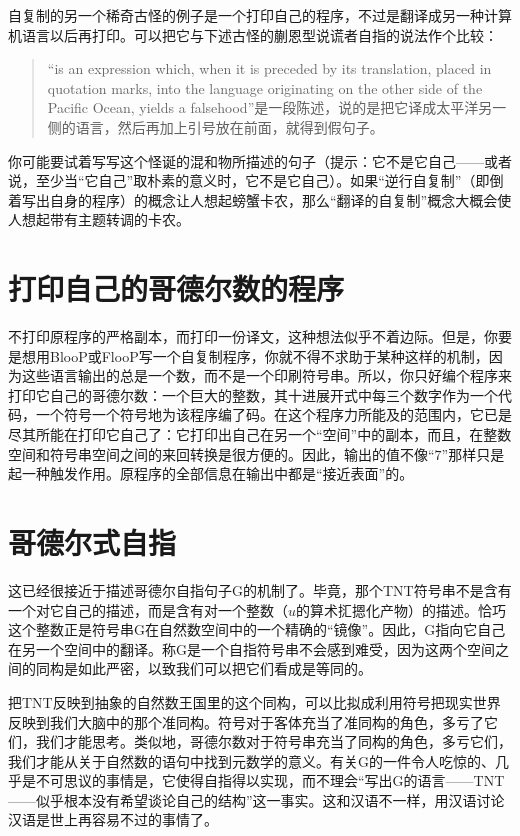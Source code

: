 自复制的另一个稀奇古怪的例子是一个打印自己的程序，不过是翻译成另一种计算机语言以后再打印。可以把它与下述古怪的蒯恩型说谎者自指的说法作个比较：
\begin{quote}
``is an expression which, when it is preceded by its translation, placed in quotation marks, into the language originating on the other side of the Pacific Ocean, yields a falsehood''是一段陈述，说的是把它译成太平洋另一侧的语言，然后再加上引号放在前面，就得到假句子。
\end{quote}

你可能要试着写写这个怪诞的混和物所描述的句子（提示：它不是它自己——或者说，至少当“它自己”取朴素的意义时，它不是它自己）。如果“逆行自复制”（即倒着写出自身的程序）的概念让人想起螃蟹卡农，那么“翻译的自复制”概念大概会使人想起带有主题转调的卡农。

\section{打印自己的哥德尔数的程序}

不打印原程序的严格副本，而打印一份译文，这种想法似乎不着边际。但是，你要是想用BlooP或FlooP写一个自复制程序，你就不得不求助于某种这样的机制，因为这些语言输出的总是一个数，而不是一个印刷符号串。所以，你只好编个程序来打印它自己的哥德尔数：一个巨大的整数，其十进展开式中每三个数字作为一个代码，一个符号一个符号地为该程序编了码。在这个程序力所能及的范围内，它已是尽其所能在打印它自己了：它打印出自己在另一个“空间”中的副本，而且，在整数空间和符号串空间之间的来回转换是很方便的。因此，输出的值不像“$7$”那样只是起一种触发作用。原程序的全部信息在输出中都是“接近表面”的。

\section{哥德尔式自指}

这已经很接近于描述哥德尔自指句子G的机制了。毕竟，那个TNT符号串不是含有一个对它自己的描述，而是含有对一个整数（$u$的算术㧟摁化产物）的描述。恰巧这个整数正是符号串G在自然数空间中的一个精确的“镜像”。因此，G指向它自己在另一个空间中的翻译。称G是一个自指符号串不会感到难受，因为这两个空间之间的同构是如此严密，以致我们可以把它们看成是等同的。

把TNT反映到抽象的自然数王国里的这个同构，可以比拟成利用符号把现实世界反映到我们大脑中的那个准同构。符号对于客体充当了准同构的角色，多亏了它们，我们才能思考。类似地，哥德尔数对于符号串充当了同构的角色，多亏它们，我们才能从关于自然数的语句中找到元数学的意义。有关G的一件令人吃惊的、几乎是不可思议的事情是，它使得自指得以实现，而不理会“写出G的语言——TNT——似乎根本没有希望谈论自己的结构”这一事实。这和汉语不一样，用汉语讨论汉语是世上再容易不过的事情了。


